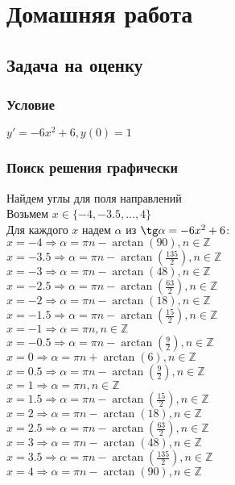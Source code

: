 \section{Домашняя работа}

\subsection{Задача на оценку}
\subsubsection{Условие}
$y' = -6x^2 + 6, y(0) = 1$

\subsubsection{Поиск решения графически}
Найдем углы для поля направлений \\
Возьмем $x \in \{-4, -3.5, ..., 4\}$ \\
Для каждого $x$ надем $\alpha$ из $\tg \alpha = -6x^2 + 6$: \\
$x = -4 \Rightarrow \alpha = \pi n - \arctan(90), n \in \mathbb{Z}$ \\
$x = -3.5 \Rightarrow \alpha = \pi n - \arctan\left(\frac{135}{2}\right), n \in \mathbb{Z}$ \\
$x = -3 \Rightarrow \alpha = \pi n - \arctan(48), n \in \mathbb{Z}$ \\
$x = -2.5 \Rightarrow \alpha = \pi n - \arctan\left(\frac{63}{2}\right), n \in \mathbb{Z}$ \\
$x = -2 \Rightarrow \alpha = \pi n - \arctan(18), n \in \mathbb{Z}$ \\
$x = -1.5 \Rightarrow \alpha = \pi n - \arctan\left(\frac{15}{2}\right), n \in \mathbb{Z}$ \\
$x = -1 \Rightarrow \alpha = \pi n , n \in \mathbb{Z}$ \\
$x = -0.5 \Rightarrow \alpha = \pi n - \arctan\left(\frac{9}{2}\right), n \in \mathbb{Z}$ \\
$x = 0 \Rightarrow \alpha = \pi n + \arctan(6), n \in \mathbb{Z}$ \\
$x = 0.5 \Rightarrow \alpha = \pi n - \arctan\left(\frac{9}{2}\right), n \in \mathbb{Z}$ \\
$x = 1 \Rightarrow \alpha = \pi n , n \in \mathbb{Z}$ \\
$x = 1.5 \Rightarrow \alpha = \pi n - \arctan\left(\frac{15}{2}\right), n \in \mathbb{Z}$ \\
$x = 2 \Rightarrow \alpha = \pi n - \arctan(18), n \in \mathbb{Z}$ \\
$x = 2.5 \Rightarrow \alpha = \pi n - \arctan\left(\frac{63}{2}\right), n \in \mathbb{Z}$ \\
$x = 3 \Rightarrow \alpha = \pi n - \arctan(48), n \in \mathbb{Z}$ \\
$x = 3.5 \Rightarrow \alpha = \pi n - \arctan\left(\frac{135}{2}\right), n \in \mathbb{Z}$ \\
$x = 4 \Rightarrow \alpha = \pi n - \arctan(90), n \in \mathbb{Z}$ \\

